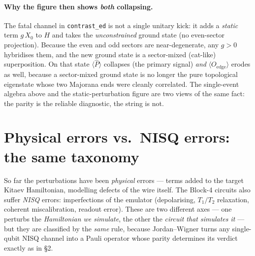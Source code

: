 \documentclass[11pt]{article}
\newcommand{\expv}[1]{\langle #1\rangle}
\newcommand{\Pop}{\hat{P}}
\newcommand{\code}[1]{\texttt{#1}}
\begin{document}
\paragraph{Why the figure then shows \emph{both} collapsing.} The fatal channel in
\code{contrast\_ed} is not a single unitary kick: it adds a \emph{static} term
$g\,X_0$ to $H$ and takes the \emph{unconstrained} ground state (no even-sector
projection). Because the even and odd sectors are near-degenerate, any $g>0$
hybridises them, and the new ground state is a sector-mixed (cat-like) superposition.
On that state $\expv{\Pop}$ collapses (the primary signal) \emph{and}
$\expv{O_{\mathrm{edge}}}$ erodes as well, because a sector-mixed ground state is no
longer the pure topological eigenstate whose two Majorana ends were cleanly
correlated. The single-event algebra above and the static-perturbation figure are two
views of the same fact: the parity is the reliable diagnostic, the string is not.

\section{Physical errors vs.\ NISQ errors: the same taxonomy}
So far the perturbations have been \emph{physical} errors --- terms added to the
target Kitaev Hamiltonian, modelling defects of the wire itself. The Block-4 circuits
also suffer \emph{NISQ} errors: imperfections of the emulator (depolarising, $T_1/T_2$
relaxation, coherent miscalibration, readout error). These are two different axes ---
one perturbs the \emph{Hamiltonian we simulate}, the other the \emph{circuit that
simulates it} --- but they are classified by the \emph{same} rule, because
Jordan--Wigner turns any single-qubit NISQ channel into a Pauli operator whose
parity determines its verdict exactly as in \S2.
\end{document}
